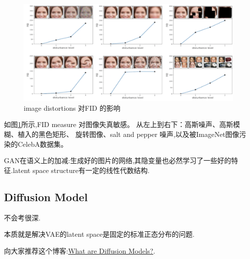 	\begin{figure}[htbp]
		\centering
		\includegraphics[scale=0.3]{figures/fid.png}
		\caption{image distortions 对FID 的影响}
		\label{fig:fid}
	\end{figure}

	如图\ref{fig:fid}所示,FID measure 对图像失真敏感。
	从左上到右下：高斯噪声、高斯模糊、植入的黑色矩形、
	旋转图像、salt and pepper 噪声,以及被ImageNet图像污染的CelebA数据集。
	
	GAN在语义上的加减:生成好的图片的网络,其隐变量也必然学习了一些好的特征.latent
	space structure有一定的线性代数结构.
	
	\subsection{Diffusion Model}

	不会考很深.

	本质就是解决VAE的latent space是固定的标准正态分布的问题.

	向大家推荐这个博客:\href{https://lilianweng.github.io/posts/2021-07-11-diffusion-models/}{What are Diffusion Models?}.
